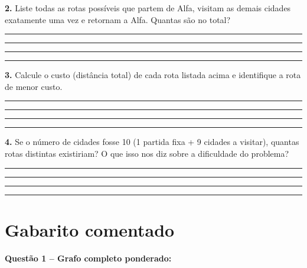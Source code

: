 \documentclass[
  12pt,
  oneside,
  a4paper,
  english,
  brazilian
  ]{abntex2}
\theoremstyle{definition}
\def\vspace#1{ }%
\def\bfseries{}%
\begin{document}
\begin{apendicesenv}
\vspace{4.5cm}

\textbf{2.} Liste todas as rotas possíveis que partem de Alfa, visitam as demais cidades exatamente uma vez e retornam a Alfa. Quantas são no total?

\vspace{0.3cm}
\noindent\rule{\textwidth}{0.4pt}\vspace{0.3cm}
\noindent\rule{\textwidth}{0.4pt}\vspace{0.3cm}
\noindent\rule{\textwidth}{0.4pt}\vspace{0.3cm}
\noindent\rule{\textwidth}{0.4pt}

\textbf{3.} Calcule o custo (distância total) de cada rota listada acima e identifique a rota de menor custo.

\vspace{0.3cm}
\noindent\rule{\textwidth}{0.4pt}\vspace{0.3cm}
\noindent\rule{\textwidth}{0.4pt}\vspace{0.3cm}
\noindent\rule{\textwidth}{0.4pt}\vspace{0.3cm}
\noindent\rule{\textwidth}{0.4pt}

\textbf{4.} Se o número de cidades fosse 10 (1 partida fixa + 9 cidades a visitar), quantas rotas distintas existiriam? O que isso nos diz sobre a dificuldade do problema?

\vspace{0.3cm}
\noindent\rule{\textwidth}{0.4pt}\vspace{0.3cm}
\noindent\rule{\textwidth}{0.4pt}\vspace{0.3cm}
\noindent\rule{\textwidth}{0.4pt}\vspace{0.3cm}
\noindent\rule{\textwidth}{0.4pt}

\newpage
\section{Gabarito comentado}

\textbf{Questão 1 – Grafo completo ponderado:}

\begin{center}
\end{center}


\end{apendicesenv}
\end{document}
